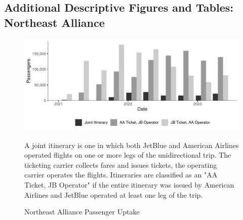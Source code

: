 \documentclass{article}
\begin{document}
\begin{appendices}
	\subsection{Additional Descriptive Figures and Tables: Northeast Alliance}
	 \begin{figure}
        \caption{Northeast Alliance Passenger Uptake}
        \label{fig:NEA_Uptake}
        \begin{center}
            \includegraphics[width = \linewidth]{05.Figures/NEA_OperationsGraph}
        \end{center}
        \vspace{-8mm}
        \footnotesize{A joint itinerary is one in which both JetBlue and American Airlines operated flights on one or more legs of the unidirectional trip. The ticketing carrier collects fares and issues tickets, the operating carrier operates the flights. Itineraries are classified as an "AA Ticket, JB Operator" if the entire itinerary was issued by American Airlines and JetBlue operated at least one leg of the trip.}
    \end{figure}


\end{appendices}
\end{document}
